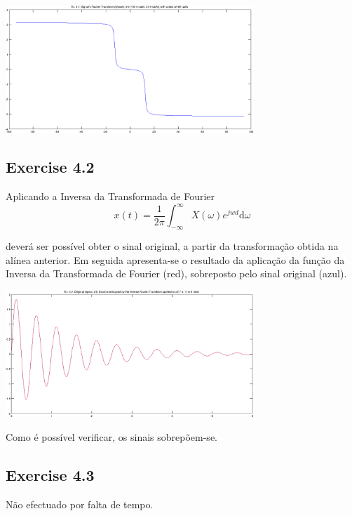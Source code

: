 \documentclass[a4paper]{article}
\begin{document}
\begin{center}
	\includegraphics[width=0.70\textwidth]{images/ex_4_1_pha.png}
	\label{fig:ex_4_1_phase}
\end{center}

\subsection{Exercise 4.2}
\noindent Aplicando a Inversa da Transformada de Fourier
\begin{equation}
	x(t) = \dfrac{1}{2\pi} \int_{-\infty}^{\infty} X (\omega) e^{jwd} \mathrm{d} \omega
\end{equation}

\noindent deverá ser possível obter o sinal original, a partir da transformação obtida na alínea anterior. Em seguida apresenta-se o resultado da aplicação da função da Inversa da Transformada de Fourier (red), sobreposto pelo sinal original (azul).
\begin{center}
	\includegraphics[width=0.70\textwidth]{images/ex_4_2.png}
	\label{fig:ex_4_2}
\end{center}

\noindent Como é possível verificar, os sinais sobrepõem-se.

\subsection{Exercise 4.3}
\noindent Não efectuado por falta de tempo.
\end{document}
